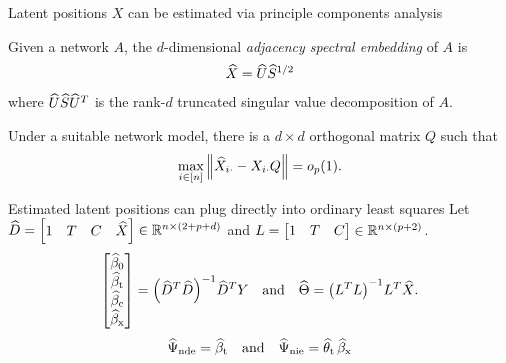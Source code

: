 \documentclass[aspectratio=169]{beamer}
\theoremstyle{remark}
\begin{document}
\begin{frame}{Latent positions $X$ can be estimated via principle components analysis}
    \begin{definition}[ASE]
        Given a network $A$, the $d$-dimensional \emph{adjacency spectral embedding} of $A$ is
        \begin{align*}
            \widehat{X} = \widehat{U} \widehat{S}^{1/2}
        \end{align*}
        \noindent where $\widehat{U} \widehat{S} \widehat{U}^T$ is the rank-$d$ truncated singular value decomposition of $A$.
    \end{definition}
    \begin{lemma}
        Under a suitable network model, there is a $d \times d$ orthogonal matrix $Q$ such that
        \begin{equation*}
            \max_{i \in [n]} \, \norm*{\Xhat_{i \cdot} - \X_{i \cdot} Q} = \op{1}.
        \end{equation*}
    \end{lemma}
\end{frame}

\begin{frame}{Estimated latent positions can plug directly into ordinary least squares}
    Let $\widehat{D} = \begin{bmatrix} 1 & T & C  & \widehat{X} \end{bmatrix} \in \mathbb{R}^{n \times (2 + p + d)}$ and $L = \begin{bmatrix} 1 & T & C \end{bmatrix} \in \mathbb{R}^{n \times (p + 2)}$.
    \begin{equation*}
        \begin{bmatrix}
            \betazerohat \\
            \betathat    \\
            \betachat    \\
            \betaxhat
        \end{bmatrix}
        = \paren*{\Dhat^T \Dhat}^{-1} \Dhat^T Y
        \quad \text{and} \quad
        \Thetahat
        = \paren*{\Wfull^T \Wfull}^{-1} \Wfull^T \Xhat.
    \end{equation*}
    \begin{align*}
        \widehat{\Psi}_\mathrm{nde} = \widehat{\beta}_\text{t} \quad \text{and} \quad \widehat{\Psi}_\mathrm{nie} = \widehat{\theta}_\text{t} \, \widehat{\beta}_\text{x}
    \end{align*}
\end{frame}
\end{document}
